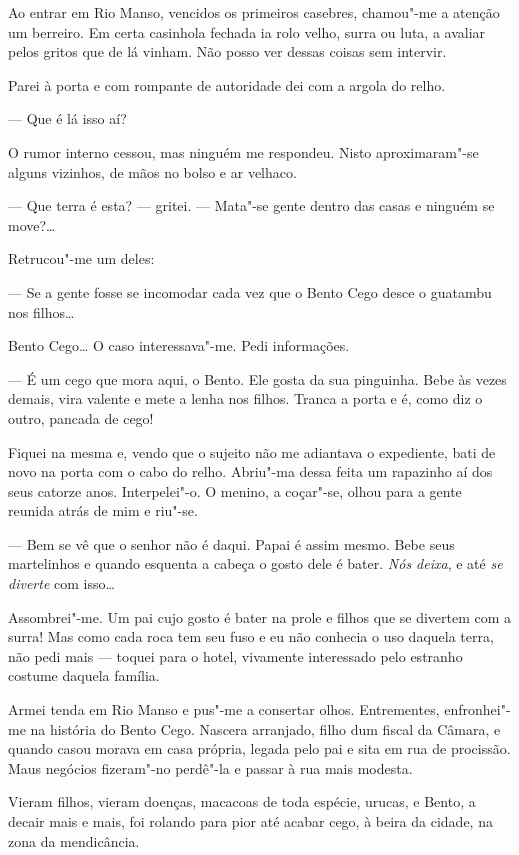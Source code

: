 Ao entrar em Rio Manso, vencidos os primeiros casebres, chamou"-me a
atenção um berreiro. Em certa casinhola fechada ia rolo velho, surra ou
luta, a avaliar pelos gritos que de lá vinham. Não posso ver dessas
coisas sem intervir.

Parei à porta e com rompante de autoridade dei com a argola do relho.

--- Que é lá isso aí?

O rumor interno cessou, mas ninguém me respondeu. Nisto aproximaram"-se
alguns vizinhos, de mãos no bolso e ar velhaco.

--- Que terra é esta? --- gritei. --- Mata"-se gente dentro das casas e
ninguém se move?\ldots{}

Retrucou"-me um deles:

--- Se a gente fosse se incomodar cada vez que o Bento Cego desce o
guatambu nos filhos\ldots{}

Bento Cego\ldots{} O caso interessava"-me. Pedi informações.

--- É um cego que mora aqui, o Bento. Ele gosta da sua pinguinha. Bebe
às vezes demais, vira valente e mete a lenha nos filhos. Tranca a porta
e é, como diz o outro, pancada de cego!

Fiquei na mesma e, vendo que o sujeito não me adiantava o expediente,
bati de novo na porta com o cabo do relho. Abriu"-ma dessa feita um
rapazinho aí dos seus catorze anos. Interpelei"-o. O menino, a coçar"-se,
olhou para a gente reunida atrás de mim e riu"-se.

--- Bem se vê que o senhor não é daqui. Papai é assim mesmo. Bebe seus
martelinhos e quando esquenta a cabeça o gosto dele é bater. \emph{Nós
deixa}, e até \emph{se diverte} com isso\ldots{}

Assombrei"-me. Um pai cujo gosto é bater na prole e filhos que se
divertem com a surra! Mas como cada roca tem seu fuso e eu não conhecia
o uso daquela terra, não pedi mais --- toquei para o hotel, vivamente
interessado pelo estranho costume daquela família.

Armei tenda em Rio Manso e pus"-me a consertar olhos. Entrementes,
enfronhei"-me na história do Bento Cego. Nascera arranjado, filho dum
fiscal da Câmara, e quando casou morava em casa própria, legada pelo pai
e sita em rua de procissão. Maus negócios fizeram"-no perdê"-la e passar à
rua mais modesta.

Vieram filhos, vieram doenças, macacoas de toda espécie, urucas, e
Bento, a decair mais e mais, foi rolando para pior até acabar cego, à
beira da cidade, na zona da mendicância.

